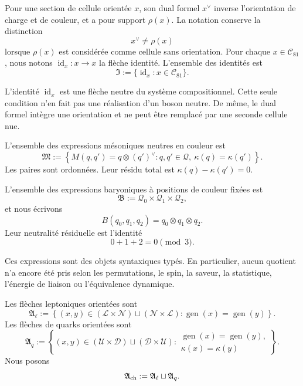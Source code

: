 \begin{definition}
\label{def:dual-identidad-composicional} Pour une section de cellule orientée \(x\), son dual formel \(x^\vee\) inverse l’orientation de charge et de couleur, et a pour support \(\rho(x)\). La notation conserve la distinction
\[
 x^\vee\ne \rho(x)
\]
lorsque \(\rho(x)\) est considérée comme cellule sans orientation. Pour chaque \(x\in\mathcal C_{81}\), nous notons \(\operatorname{id}_x:x\to x\) la flèche identité. L’ensemble des identités est
\[
 \mathfrak I
 :=\{\operatorname{id}_x:x\in\mathcal C_{81}\}.
\]
\end{definition}

L’identité \(\operatorname{id}_x\) est une flèche neutre du système compositionnel. Cette seule condition n’en fait pas une réalisation d’un boson neutre. De même, le dual formel intègre une orientation et ne peut être remplacé par une seconde cellule nue.

\begin{definition}
\label{def:expresiones-mesonicas-barionicas} L’ensemble des expressions mésoniques neutres en couleur est
\[
 \mathfrak M
 :=
 \left\{
   M(q,q')=q\otimes{(q')}^\vee:
   q,q'\in\mathcal Q,\ \kappa(q)=\kappa(q')
 \right\}.
\]
Les paires sont ordonnées. Leur résidu total est \(\kappa(q)-\kappa(q')=0\).

L’ensemble des expressions baryoniques à positions de couleur fixées est
\[
 \mathfrak B
 :=
 \mathcal Q_0\times\mathcal Q_1\times\mathcal Q_2,
\]
et nous écrivons
\[
 B(q_0,q_1,q_2)=q_0\otimes q_1\otimes q_2.
\]
Leur neutralité résiduelle est l’identité
\[
 0+1+2=0\pmod3.
\]
\end{definition}

Ces expressions sont des objets syntaxiques typés. En particulier, aucun quotient n’a encore été pris selon les permutations, le spin, la saveur, la statistique, l’énergie de liaison ou l’équivalence dynamique.

\begin{definition}
\label{def:flechas-cargadas-compatibles} Les flèches leptoniques orientées sont
\[
 \mathfrak A_\ell
 :=
 \left\{
 (x,y)\in
   (\mathcal L\times\mathcal N)
   \sqcup
   (\mathcal N\times\mathcal L):
 \operatorname{gen}(x)=\operatorname{gen}(y)
 \right\}.
\]
Les flèches de quarks orientées sont
\[
 \mathfrak A_q
 :=
 \left\{
 (x,y)\in
   (\mathcal U\times\mathcal D)
   \sqcup
   (\mathcal D\times\mathcal U):
 \begin{array}{l}
 \operatorname{gen}(x)=\operatorname{gen}(y),\\[-2pt]
 \kappa(x)=\kappa(y)
 \end{array}
 \right\}.
\]
Nous posons
\[
 \mathfrak A_{\rm ch}:=\mathfrak A_\ell\sqcup\mathfrak A_q.
\]
\end{definition}

